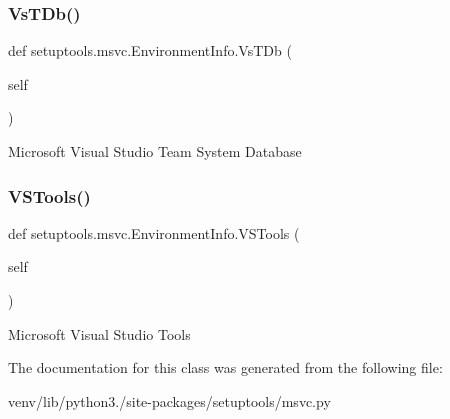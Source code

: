 \subsubsection{\texorpdfstring{Vs\+T\+Db()}{VsTDb()}}
{\footnotesize\ttfamily def setuptools.\+msvc.\+Environment\+Info.\+Vs\+T\+Db (\begin{DoxyParamCaption}\item[{}]{self }\end{DoxyParamCaption})}

\begin{DoxyVerb}Microsoft Visual Studio Team System Database
\end{DoxyVerb}
 \mbox{\label{classsetuptools_1_1msvc_1_1_environment_info_a942785692dbd53f81650af2a9c18e0ff}} 
\subsubsection{\texorpdfstring{V\+S\+Tools()}{VSTools()}}
{\footnotesize\ttfamily def setuptools.\+msvc.\+Environment\+Info.\+V\+S\+Tools (\begin{DoxyParamCaption}\item[{}]{self }\end{DoxyParamCaption})}

\begin{DoxyVerb}Microsoft Visual Studio Tools
\end{DoxyVerb}
 

The documentation for this class was generated from the following file\+:\begin{DoxyCompactItemize}
\item 
venv/lib/python3./site-\/packages/setuptools/msvc.\+py\end{DoxyCompactItemize}
